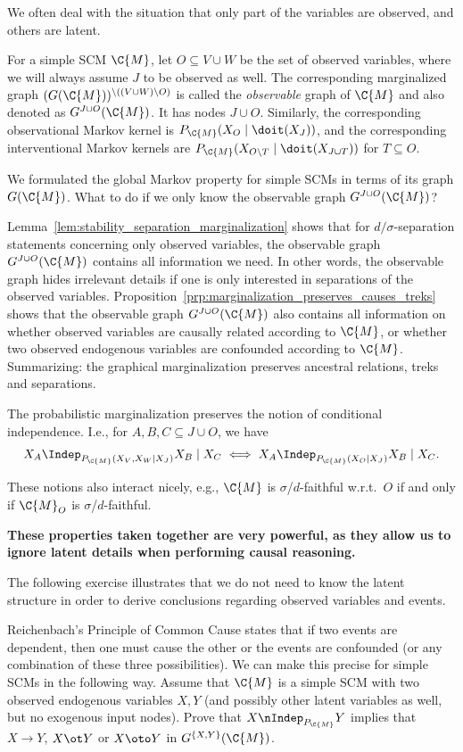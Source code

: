 We often deal with the situation that only part of the variables are observed, and others
are latent.
\begin{Not}
For a simple SCM $\C{M}$, let $O \subseteq V \cup W$ be the set of observed variables,
where we will always assume $J$ to be observed as well.
The corresponding marginalized graph $(G(\C{M}))^{\setminus((V \cup W) \setminus O)}$ is called the
\emph{observable} graph of $\C{M}$ and also denoted as $G^{J\cup O}(\C{M})$. It has nodes $J \cup O$.
Similarly, the corresponding observational Markov kernel is $P_{\C{M}}(X_O \mid \doit(X_J))$, and the
corresponding interventional Markov kernels are $P_{\C{M}}(X_{O\setminus T} \mid \doit(X_{J\cup T}))$
for $T \subseteq O$.
\end{Not}
We formulated the global Markov property for simple SCMs in terms of its graph $G(\C{M})$. 
What to do if we only know the observable graph $G^{J \cup O}(\C{M})$? 
\begin{Rem}
Lemma~\ref{lem:stability_separation_marginalization} shows that for $d/\sigma$-separation statements
concerning only observed variables, the observable graph $G^{J \cup O}(\C{M})$ contains all information we need.
In other words, the observable graph hides irrelevant details if one is only interested in separations
of the observed variables.
Proposition~\ref{prp:marginalization_preserves_causes_treks} shows that the observable graph $G^{J \cup O}(\C{M})$
also contains all information on whether observed variables are causally related according to $\C{M}$,
or whether two observed endogenous variables are confounded according to $\C{M}$.
Summarizing: the graphical marginalization preserves ancestral relations, treks and separations.

The probabilistic marginalization preserves the notion of conditional independence. I.e.,
for $A, B, C \subseteq J \cup O$, we have
  $$X_A \Indep_{P_{\C{M}}(X_V,X_W \mid X_J)} X_B \mid X_C \iff X_A \Indep_{P_{\C{M}}(X_O \mid X_J)} X_B \mid X_C.$$

These notions also interact nicely, e.g., $\C{M}$ is $\sigma$/$d$-faithful w.r.t.\ $O$ if and only if
$\C{M}_O$ is $\sigma$/$d$-faithful.

\textbf{These properties taken together are very powerful, as they allow us to ignore latent details when performing
causal reasoning.}
\end{Rem}

The following exercise illustrates that we do not need to know the latent structure in order
to derive conclusions regarding observed variables and events.
\begin{Exc}
  Reichenbach's Principle of Common Cause states that if two events are dependent,
  then one must cause the other or the events are confounded (or any combination of these three possibilities).
  We can make this precise for simple SCMs in the following way. Assume that $\C{M}$
  is a simple SCM with two observed endogenous variables $X,Y$ (and possibly other
  latent variables as well, but no exogenous input nodes). Prove that 
  $X \nIndep_{P_{\C{M}}} Y$
  implies that $X \to Y$,
  $X \ot Y$ or $X \oto Y$ in $G^{\{X,Y\}}(\C{M})$.
\end{Exc}

